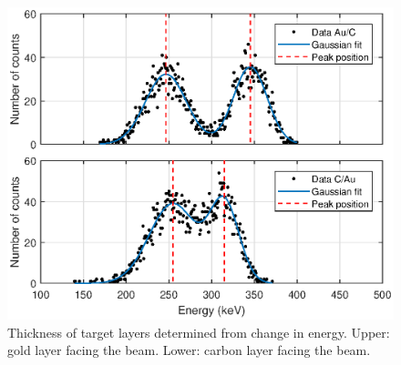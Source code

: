 


\begin{figure}[t]
\centering
\includegraphics[width=0.99\columnwidth]{Dterminethicknessplot.eps}
\caption{Thickness of target layers determined from change in energy. Upper: gold layer facing the beam. Lower: carbon layer facing the beam.}
\label{fig_thickness}
\end{figure}



